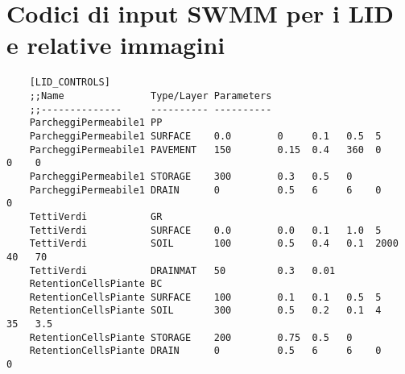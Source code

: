 \section{Codici di input SWMM per i LID e relative immagini}
\label{appendix:codiceLID}
\begin{lstlisting}
    [LID_CONTROLS]
    ;;Name               Type/Layer Parameters
    ;;--------------     ---------- ----------
    ParcheggiPermeabile1 PP
    ParcheggiPermeabile1 SURFACE    0.0        0     0.1   0.5  5
    ParcheggiPermeabile1 PAVEMENT   150        0.15  0.4   360  0     0    0
    ParcheggiPermeabile1 STORAGE    300        0.3   0.5   0
    ParcheggiPermeabile1 DRAIN      0          0.5   6     6    0     0
    TettiVerdi           GR
    TettiVerdi           SURFACE    0.0        0.0   0.1   1.0  5
    TettiVerdi           SOIL       100        0.5   0.4   0.1  2000  40   70
    TettiVerdi           DRAINMAT   50         0.3   0.01
    RetentionCellsPiante BC
    RetentionCellsPiante SURFACE    100        0.1   0.1   0.5  5
    RetentionCellsPiante SOIL       300        0.5   0.2   0.1  4     35   3.5
    RetentionCellsPiante STORAGE    200        0.75  0.5   0
    RetentionCellsPiante DRAIN      0          0.5   6     6    0     0
\end{lstlisting}
%
